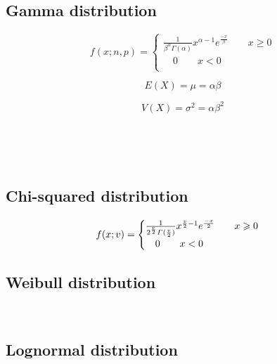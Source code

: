 \documentclass[UTF8]{ctexart}
\numberwithin{equation}{subsection}%
\begin{document}
	\subsection{Gamma distribution}
	\begin{LARGE}
		\begin{equation}
			f(x;n,p)=\begin{cases}
			\frac{1}{\beta^\alpha \varGamma(\alpha) }x^{\alpha-1}e^{\frac{-x}{\beta}}\qquad x\geqslant 0\\
				\quad 0\qquad x< 0\\
			\end{cases}
		\end{equation}		
	\end{LARGE}
	\begin{Large}
		\begin{equation}
			E(X) =\mu =\alpha\beta
		\end{equation}		
	\end{Large}
	\begin{Large}
		\begin{equation}
			V(X) =\sigma^2 =\alpha\beta^2
		\end{equation}		
	\end{Large}
	~\\
	~\\
	~\\
	\subsection{Chi-squared distribution}
	\begin{LARGE}
		\begin{equation}
			f(x;v)=\begin{cases}
				\frac{1}{2^{\tiny{\frac{v}{2}}} \varGamma(\frac{v}{2}) }x^{\tiny{\frac{v}{2}-1}}e^{\tiny{\frac{-x}{2}}} \qquad x\geqslant 0\\
				\quad 0\qquad x< 0\\
			\end{cases}
		\end{equation}		
	\end{LARGE}
	\subsection{Weibull distribution}
	~\\
	\subsection{Lognormal distribution}
	~\\
\end{document}
